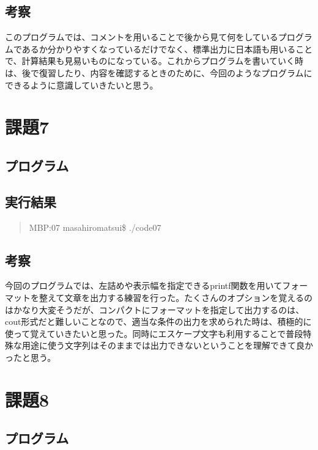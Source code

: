 \documentclass[11pt,a4paper]{jsarticle}
\begin{document}
\subsection{考察}
このプログラムでは、コメントを用いることで後から見て何をしているプログラムであるか分かりやすくなっているだけでなく、標準出力に日本語も用いることで、計算結果も見易いものになっている。これからプログラムを書いていく時は、後で復習したり、内容を確認するときのために、今回のようなプログラムにできるように意識していきたいと思う。
%

\section{課題7}

\subsection{プログラム}
\label{sec:prog-list1}

%
\subsection{実行結果}
\begin{quote}           %
MBP:07 masahiromatsui\$ ./code07 \\

\end{quote}

\subsection{考察}
今回のプログラムでは、左詰めや表示幅を指定できるprintf関数を用いてフォーマットを整えて文章を出力する練習を行った。たくさんのオプションを覚えるのはかなり大変そうだが、コンパクトにフォーマットを指定して出力するのは、cout形式だと難しいことなので、適当な条件の出力を求められた時は、積極的に使って覚えていきたいと思った。同時にエスケープ文字も利用することで普段特殊な用途に使う文字列はそのままでは出力できないということを理解できて良かったと思う。
%

\section{課題8}

\subsection{プログラム}
\label{sec:prog-list1}

%
\end{document}
